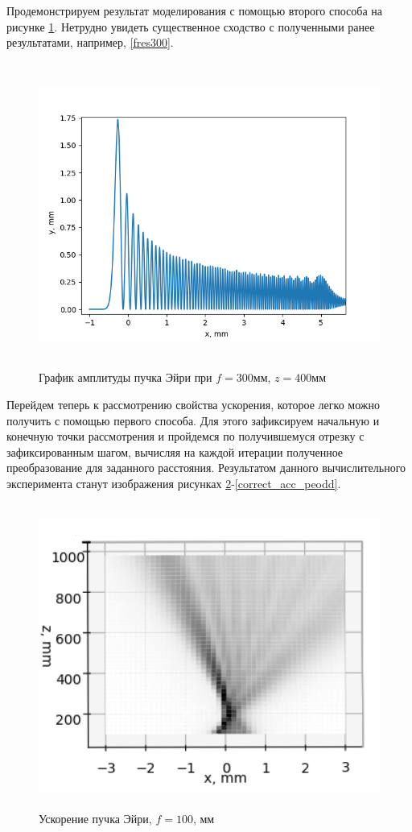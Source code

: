{	Продемонстрируем результат моделирования с помощью второго способа на рисунке \ref{four_fres_300_400}. Нетрудно увидеть существенное сходство с полученными ранее результатами, например, 	\ref{fres300}.
		\begin{figure}[H]
	\centering
\includegraphics[height = 10cm]{plots/four_fres_300_400.png}
\caption{График амплитуды пучка Эйри при $f = 300$мм, $z = 400$мм}
	\label{four_fres_300_400}
\end{figure}
	\vspace{0.5cm}

	Перейдем теперь к рассмотрению свойства ускорения, которое легко можно получить с помощью первого способа. Для этого зафиксируем начальную и конечную точки рассмотрения и пройдемся по получившемуся отрезку с зафиксированным шагом, вычисляя на каждой итерации полученное преобразование для заданного расстояния. Результатом данного вычислительного эксперимента станут изображения  рисунках \ref{correct_acc}-\ref{correct_acc_peodd}.
	\begin{figure}[H]
	\centering
\includegraphics[height = 10cm]{plots/ai_acc_before_focus.png}
\caption{Ускорение пучка Эйри, $f = 100$, мм}
	\label{correct_acc}
\end{figure}
	
}
